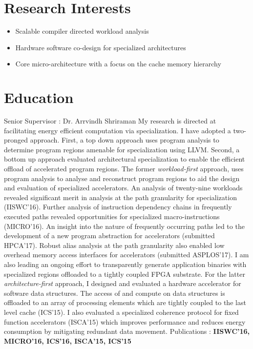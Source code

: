 \documentclass[11pt,letterpaper,sans]{moderncv}   %
\begin{document}
\makecvtitle
\vspace{-40pt}

\section{Research Interests}
\begin{itemize}[noitemsep,nolistsep]
\item Scalable compiler directed workload analysis 
\item Hardware software co-design for specialized architectures 
\item Core micro-architecture with a focus on the cache memory hierarchy
\end{itemize}

\section{Education}
{Senior Supervisor : Dr. Arrvindh Shriraman \newline{} 
My research is directed at facilitating energy efficient computation via specialization. I have adopted a two-pronged approach. First, a top down approach uses program analysis to determine program regions amenable for specialization using LLVM. Second, a bottom up approach evaluated architectural specialization to enable the efficient offload of accelerated program regions.
\newline{}The former {\em workload-first} approach, uses program analysis to analyse and reconstruct program regions to aid the design and evaluation of specialized accelerators. An analysis of twenty-nine workloads revealed significant merit in analysis at the path granularity for specialization (IISWC'16). Further analysis of instruction dependency chains in frequently executed paths revealed opportunities for specialized macro-instructions (MICRO'16). An insight into the nature of frequently occurring paths led to the development of a new program abstraction for accelerators (submitted HPCA'17). Robust alias analysis at the path granularity also enabled low overhead memory access interfaces for accelerators (submitted ASPLOS'17). I am also leading an ongoing effort to transparently generate application binaries with specialized regions offloaded to a tightly coupled FPGA substrate.
\newline{}For the latter {\em architecture-first} approach, I designed and evaluated a hardware accelerator for software data structures. The access of and compute on data structures is offloaded to an array of processing elements which are tightly coupled to the last level cache (ICS'15). I also evaluated a specialized coherence protocol for fixed function accelerators (ISCA'15) which improves performance and reduces energy consumption by mitigating redundant data movement.
\newline{} Publications : \textbf{IISWC'16, MICRO'16, ICS'16, ISCA'15, ICS'15}}
\end{document}
